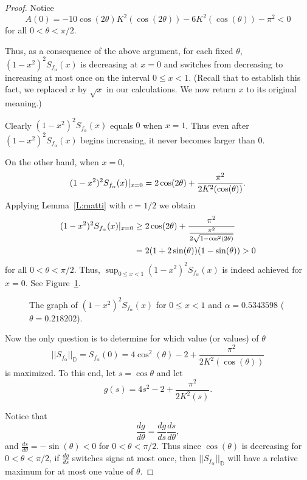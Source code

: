 \documentclass{lms}
\newcommand{\D}{\mathbb D}
\newcommand{\norm}[1]{\lvert\lvert#1\rvert\rvert}
\numberwithin{equation}{section}
\begin{document}
\begin{proof}
Notice
\[
A(0)=-10\cos(2\theta)K^2(\cos(2\theta)) -6K^2(\cos(\theta))-\pi^2 <0
\]
for all $0<\theta<\pi/2$.  

Thus, as a consequence of the above argument, for each fixed $\theta$,
$ %
(1-x^2)^2S_{f_\alpha}(x)$ is decreasing at $x=0$ and
switches from decreasing to increasing at most once on the interval
$0\leq x <1$. (Recall that to establish this fact, we replaced
$x$ by $\sqrt{x}$ in our calculations.  We now  return $x$ to its
original meaning.)

Clearly  $(1-x^2)^2S_{f_\alpha}(x)$ equals $0$ when $x=1$.  
Thus even after $(1-x^2)^2S_{f_\alpha}(x)$ begins increasing, it never
becomes larger than $0$.

On the other hand, when $x=0$,
\begin{equation}\notag
(1-x^2)^2S_{f_\alpha}(x)|_{x=0} = 2\cos(2\theta)+\frac{\pi^2}{2K^2(\cos(\theta))}.
\end{equation}
Applying Lemma~\ref{L:matti} with $c=1/2$ %
we obtain
\begin{align}\notag
(1-x^2)^2S_{f_\alpha}(x)|_{x=0} 
&\geq  2\cos(2\theta)+\frac{\pi^2}{\frac{\pi^2}{2
\sqrt{1-\cos^2(2\theta)}}} \\\notag
&=2(1+2\sin(\theta))(1-\sin(\theta))>0
\end{align}
for all $0<\theta<\pi/2$.
Thus, $\sup_{0\leq x<1}(1-x^2)^2 S_{f_\alpha}(x)$ is indeed achieved for $x=0$.
See Figure~\ref{F:x-running}.



\begin{figure}
\begin{center}
\caption{The graph of $(1-x^2)^2{S_{f_\alpha}(x)}$ for $0\leq x<1$ and
$\alpha=0.5343598$ ($\theta=0.218202$).}
\label{F:x-running}
\end{center}
\end{figure}

Now the only question is to determine for which value (or values) of $\theta$ 
\[
\norm{S_{f_\alpha}}_\D=S_{f_\alpha}(0) 
= 4\cos^2(\theta)-2+\frac{\pi^2}{2K^2(\cos(\theta))}
\]
is maximized.  
To this end, let $s=\cos \theta$ and let 
\[
g(s)=4s^2-2+\frac{\pi^2}{2K^2({s})}.
\]

Notice that 
\[
\frac{dg}{d\theta}=\frac{dg}{ds}\frac{ds}{d\theta},
\]
and $\frac{ds}{d\theta}=-\sin(\theta)<0$ for $0<\theta<\pi/2$.
Thus since $\cos(\theta)$ is decreasing for $0<\theta<\pi/2$, 
if $\frac{dg}{ds}$ switches signs at most once, then $\norm{S_{f_\alpha}}_\D$
will have a relative maximum  for  at most one value of $\theta$.


\end{proof}
\end{document}
